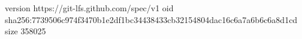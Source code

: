 version https://git-lfs.github.com/spec/v1
oid sha256:7739506c974f3470b1e2df1bc34438433cb32154804dac16c6a7a6b6c6a8d1cd
size 358025
